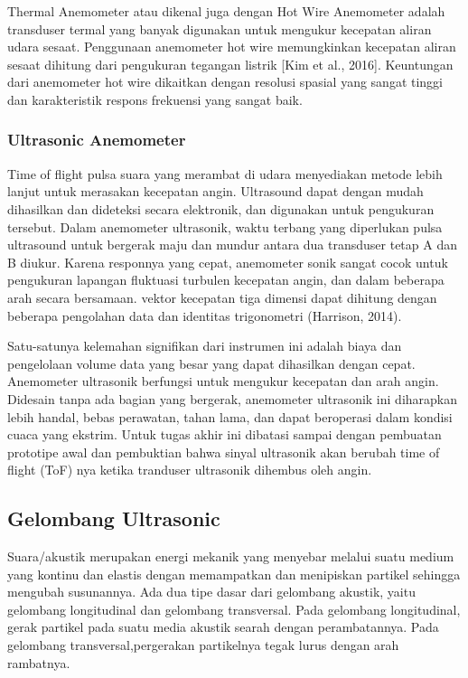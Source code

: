 	Thermal Anemometer atau dikenal juga dengan Hot Wire Anemometer adalah transduser termal yang banyak digunakan untuk mengukur kecepatan aliran udara 
  sesaat. Penggunaan anemometer hot wire memungkinkan kecepatan aliran sesaat dihitung dari pengukuran tegangan listrik [Kim et al., 2016]. Keuntungan 
  dari anemometer hot wire dikaitkan dengan resolusi spasial yang sangat tinggi dan karakteristik respons frekuensi yang sangat baik.
	
	\subsubsection{Ultrasonic Anemometer}
	
	Time of flight pulsa suara yang merambat di udara menyediakan metode lebih lanjut untuk merasakan kecepatan angin. Ultrasound dapat dengan mudah 
  dihasilkan dan dideteksi secara elektronik, dan digunakan untuk pengukuran tersebut. Dalam anemometer ultrasonik, waktu terbang yang diperlukan 
  pulsa ultrasound untuk bergerak maju dan mundur antara dua transduser tetap A dan B diukur. Karena responnya yang cepat, anemometer sonik sangat 
  cocok untuk pengukuran lapangan fluktuasi turbulen kecepatan angin, dan dalam beberapa arah secara bersamaan. vektor kecepatan tiga dimensi dapat 
  dihitung dengan beberapa pengolahan data dan identitas trigonometri (Harrison, 2014).
	
	Satu-satunya kelemahan signifikan dari instrumen ini adalah biaya dan pengelolaan volume data yang besar yang dapat dihasilkan dengan cepat. 
  Anemometer ultrasonik berfungsi untuk mengukur kecepatan dan arah angin. Didesain tanpa ada bagian yang bergerak, anemometer ultrasonik ini 
  diharapkan lebih handal, bebas perawatan, tahan lama, dan dapat beroperasi dalam kondisi cuaca yang ekstrim. Untuk tugas akhir ini dibatasi 
  sampai dengan pembuatan prototipe awal dan pembuktian bahwa sinyal ultrasonik akan berubah time of flight (ToF) nya ketika tranduser ultrasonik 
  dihembus oleh angin.

\subsection{Gelombang Ultrasonic}
Suara/akustik merupakan energi mekanik yang menyebar melalui suatu medium yang kontinu dan elastis dengan memampatkan dan menipiskan partikel 
sehingga mengubah susunannya. Ada dua tipe dasar dari gelombang akustik, yaitu gelombang longitudinal dan gelombang transversal. Pada gelombang 
longitudinal, gerak partikel pada suatu media akustik searah dengan perambatannya. Pada gelombang transversal,pergerakan partikelnya tegak lurus dengan arah rambatnya.

